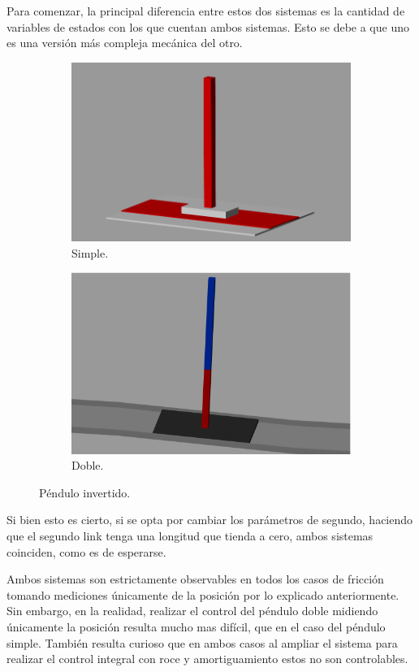Para comenzar, la principal diferencia entre estos dos sistemas es la cantidad de variables de estados con los que cuentan ambos sistemas.
Esto se debe a que uno es una versión más compleja mecánica del otro.
\begin{figure}[H]
\begin{subfigure}{.5\textwidth}
  \centering
  \includegraphics[width=0.95\linewidth]{../Analisis de Resultados/ImagenesAnalisis de Resultados/equilibrio.png}
  \caption{Simple.}
  \label{fig:sfig1}
\end{subfigure}%
\begin{subfigure}{.5\textwidth}
  \centering
  \includegraphics[width=0.95\linewidth]{../Analisis de Resultados/ImagenesAnalisis de Resultados/simscape_double_pendulum.png}
  \caption{Doble.}
  \label{fig:sfig2}
\end{subfigure}
\caption{Péndulo invertido.}
\label{fig:fig}
\end{figure}
Si bien esto es cierto, si se opta por cambiar los parámetros de segundo, haciendo que el segundo link tenga una longitud que tienda a cero, ambos sistemas coinciden, como es de esperarse.

Ambos sistemas son estrictamente observables en todos los casos de fricción tomando mediciones únicamente de la posición por lo explicado anteriormente. Sin embargo, en la realidad, realizar el control del péndulo doble midiendo únicamente la posición resulta mucho mas difícil, que en el caso del péndulo simple.
También resulta curioso que en ambos casos al ampliar el sistema para realizar el control integral con roce y amortiguamiento estos no son controlables.
%